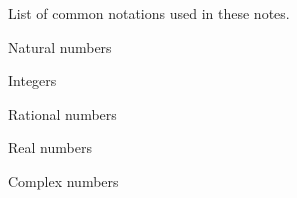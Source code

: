 %


List of common notations used in these notes.

\begin{description}[CABR] %
    \item[$\N$]{Natural numbers}
    \item[$\Z$]{Integers}
    \item[$\Q$]{Rational numbers}
    \item[$\R$]{Real numbers}
    \item[$\C$]{Complex numbers}
\end{description}